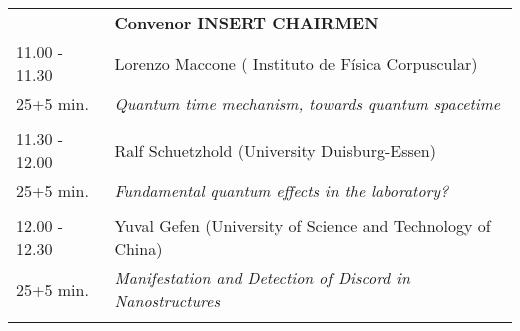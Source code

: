 \begin{longtable}{p{3cm}p{13cm}}
&\hfill {\bf Convenor INSERT CHAIRMEN }\\ 
11.00 - 11.30 & Lorenzo Maccone ( Instituto de Física Corpuscular)\\ 
25+5 min. & {\it Quantum time mechanism, towards quantum spacetime}\\ 
 & \\ 
11.30 - 12.00 & Ralf Schuetzhold (University Duisburg-Essen)\\ 
25+5 min. & {\it Fundamental quantum effects in the laboratory?}\\ 
 & \\ 
12.00 - 12.30 & Yuval Gefen (University of Science and Technology of China)\\ 
25+5 min. & {\it Manifestation and Detection of Discord in Nanostructures}\\ 
 & \\ 
\end{longtable}

